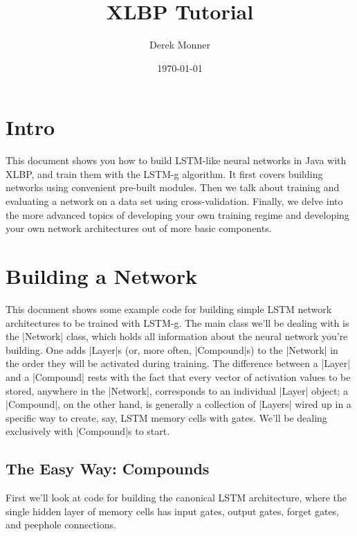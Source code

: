 \documentclass{article}
\author{Derek Monner}
\title{XLBP Tutorial}
\date{\today}
\begin{document}
\maketitle

\section{Intro}

This document shows you how to build LSTM-like neural networks in Java with XLBP, and train them with the
LSTM-g algorithm. It first covers building networks using convenient pre-built modules. Then we talk about
training and evaluating a network on a data set using cross-validation. Finally, we delve into the
more advanced topics of developing your own training regime and developing your own network
architectures out of more basic components.


\section{Building a Network}

This document shows some example code for building simple LSTM network architectures to be trained 
with LSTM-g. The main class we'll be dealing with is the |Network| class, which holds all information
about the neural network you're building. One adds |Layer|s (or, more often, |Compound|s) to the |Network|
in the order they will be activated during training. The difference between a |Layer| and a |Compound|
rests with the fact that every vector of activation values to be stored, anywhere in the |Network|,
corresponds to an individual |Layer| object; a |Compound|, on the other hand, is generally a collection
of |Layers| wired up in a specific way to create, say, LSTM memory cells with gates. We'll be dealing
exclusively with |Compound|s to start.

\subsection{The Easy Way: Compounds}

First we'll look at code for building the canonical LSTM architecture, where the single hidden layer
of memory cells has input gates, output gates, forget gates, and peephole connections.
\end{document}
